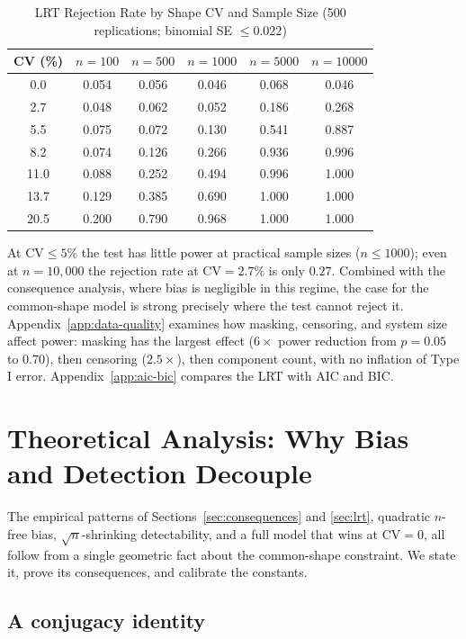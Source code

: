\documentclass[11pt]{article}
\newcommand{\CV}{\mathrm{CV}}
\begin{document}
\begin{table}[htbp]
\centering
\caption{LRT Rejection Rate by Shape CV and Sample Size (500 replications; binomial SE $\leq 0.022$)}
\label{tab:power-by-cv}
\small
\begin{tabular}{cccccc}
\hline
CV (\%) & $n=100$ & $n=500$ & $n=1000$ & $n=5000$ & $n=10000$ \\
\hline
0.0 & 0.054 & 0.056 & 0.046 & 0.068 & 0.046 \\
2.7 & 0.048 & 0.062 & 0.052 & 0.186 & 0.268 \\
5.5 & 0.075 & 0.072 & 0.130 & 0.541 & 0.887 \\
8.2 & 0.074 & 0.126 & 0.266 & 0.936 & 0.996 \\
11.0 & 0.088 & 0.252 & 0.494 & 0.996 & 1.000 \\
13.7 & 0.129 & 0.385 & 0.690 & 1.000 & 1.000 \\
20.5 & 0.200 & 0.790 & 0.968 & 1.000 & 1.000 \\
\hline
\end{tabular}
\end{table}

At $\CV \leq 5\%$ the test has little power at practical sample sizes ($n \leq 1000$); even at $n = 10{,}000$ the rejection rate at $\CV = 2.7\%$ is only $0.27$. Combined with the consequence analysis, where bias is negligible in this regime, the case for the common-shape model is strong precisely where the test cannot reject it. Appendix~\ref{app:data-quality} examines how masking, censoring, and system size affect power: masking has the largest effect ($6\times$ power reduction from $p=0.05$ to $0.70$), then censoring ($2.5\times$), then component count, with no inflation of Type I error. Appendix~\ref{app:aic-bic} compares the LRT with AIC and BIC.

\section{Theoretical Analysis: Why Bias and Detection Decouple}
\label{sec:theory}

The empirical patterns of Sections~\ref{sec:consequences} and \ref{sec:lrt}, quadratic $n$-free bias, $\sqrt{n}$-shrinking detectability, and a full model that wins at $\CV=0$, all follow from a single geometric fact about the common-shape constraint. We state it, prove its consequences, and calibrate the constants.

\subsection{A conjugacy identity}
\end{document}
